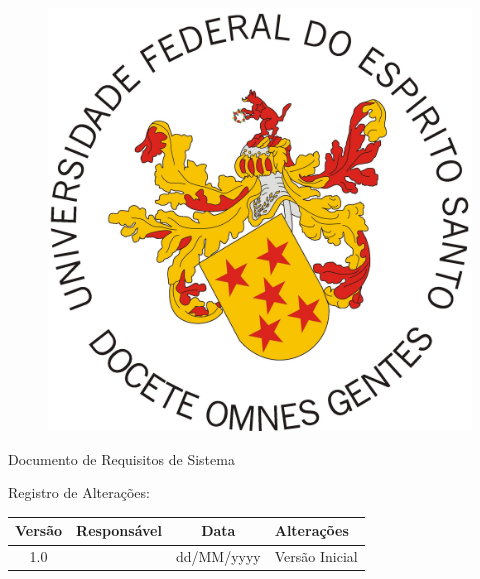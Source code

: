 \documentclass[
12pt,				
oneside,		
a4paper,			
english,			%
french,				%
spanish,			%
brazil				%
]{abntex2}
\newcommand{\subtitulo}{Documento de Requisitos de Sistema}
\renewcommand{\imprimircapa}{%
	\begin{capa}%
		\center
		
		{\ABNTEXchapterfont\large\subtitulo{}}
		\vfill
		\begin{center}
			\ABNTEXchapterfont\bfseries\LARGE\imprimirtitulo
		\end{center}
		
		\vfill
		Registro de Alterações:
		\begin{table}[h]
			\centering
			\vspace{0.5cm}
			\begin{tabular}{|c|c|c|p{4.5cm}|} \hline \rowcolor[rgb]{0.8,0.8,0.8}
 				
 				Versão & Responsável & Data  & Alterações \\	\hline  
 				                            
				1.0  & \imprimirautor & dd/MM/yyyy & Versão Inicial  \\ \hline 
			 
			\end{tabular}
		\end{table}
		
		\vfill
		\large\imprimirlocal
		\linebreak
		\large\imprimirdata
		\vspace*{1cm}
	\end{capa}
}
\begin{document}
\frenchspacing

\begin{figure}[h]
	\centering
	\includegraphics[scale=0.055]{brasao.jpg}
	\label{ppts3}
\end{figure} 

\imprimircapa





\textual



















\postextual

\printindex

\end{document}
